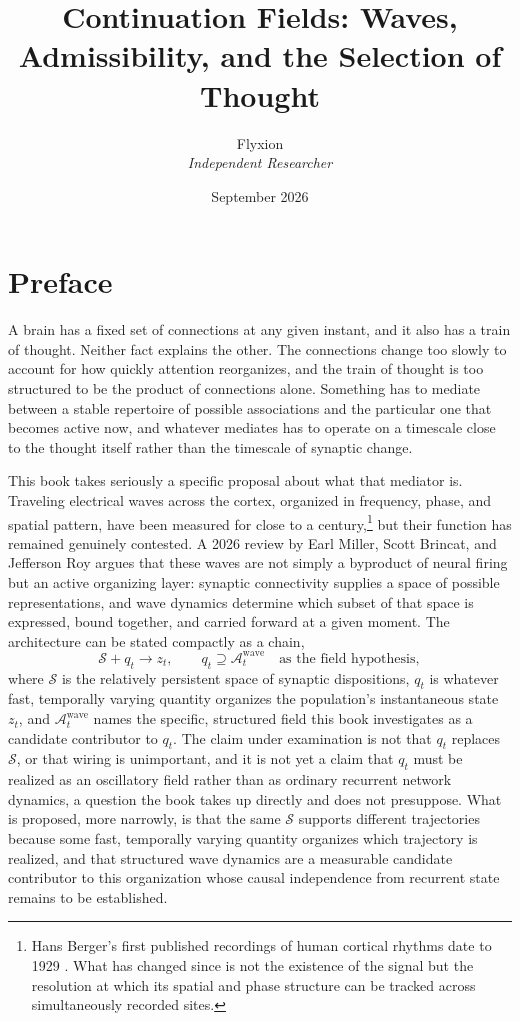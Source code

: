 \documentclass[11pt]{book}
\title{Continuation Fields: Waves, Admissibility, and the Selection of Thought}
\author{Flyxion \\ \textit{Independent Researcher}}
\date{September 2026}
\begin{document}
\maketitle

\chapter*{Preface}

A brain has a fixed set of connections at any given instant, and it also has a train of thought. Neither fact explains the other. The connections change too slowly to account for how quickly attention reorganizes, and the train of thought is too structured to be the product of connections alone. Something has to mediate between a stable repertoire of possible associations and the particular one that becomes active now, and whatever mediates has to operate on a timescale close to the thought itself rather than the timescale of synaptic change.

This book takes seriously a specific proposal about what that mediator is. Traveling electrical waves across the cortex, organized in frequency, phase, and spatial pattern, have been measured for close to a century,\footnote{Hans Berger's first published recordings of human cortical rhythms date to 1929 \cite{berger1929}. What has changed since is not the existence of the signal but the resolution at which its spatial and phase structure can be tracked across simultaneously recorded sites.} but their function has remained genuinely contested. A 2026 review by Earl Miller, Scott Brincat, and Jefferson Roy \cite{miller2026} argues that these waves are not simply a byproduct of neural firing but an active organizing layer: synaptic connectivity supplies a space of possible representations, and wave dynamics determine which subset of that space is expressed, bound together, and carried forward at a given moment. The architecture can be stated compactly as a chain,
\[
\mathcal S + q_t \longrightarrow z_t,
\qquad
q_t\supseteq\mathcal A_t^{\mathrm{wave}}
\quad\text{as the field hypothesis},
\]
where $\mathcal S$ is the relatively persistent space of synaptic dispositions, $q_t$ is whatever fast, temporally varying quantity organizes the population's instantaneous state $z_t$, and $\mathcal A_t^{\mathrm{wave}}$ names the specific, structured field this book investigates as a candidate contributor to $q_t$. The claim under examination is not that $q_t$ replaces $\mathcal S$, or that wiring is unimportant, and it is not yet a claim that $q_t$ must be realized as an oscillatory field rather than as ordinary recurrent network dynamics, a question the book takes up directly and does not presuppose. What is proposed, more narrowly, is that the same $\mathcal S$ supports different trajectories because some fast, temporally varying quantity organizes which trajectory is realized, and that structured wave dynamics are a measurable candidate contributor to this organization whose causal independence from recurrent state remains to be established.
\end{document}
